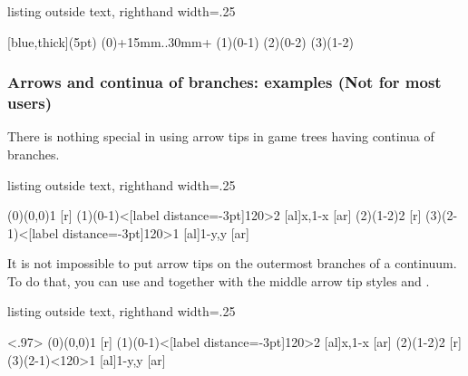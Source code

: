 \begin{tcblisting}{listing outside text, righthand width=.25\linewidth}
\begin{istgame}
[blue,thick](5pt)
\xtShowArrows
\istroot(0)+15mm..30mm+  \istb[blue] \istb[red] \endist
\xtHideArrows
\istroot(1)(0-1)   \istb \endist
\xtHideArrows* %
\istroot(2)(0-2)   \istb \endist
{}
\istroot(3)(1-2)   \istb \endist
\end{istgame}
\end{tcblisting}


\subsubsection{Arrows and continua of branches: examples (Not for most users)}

There is nothing special in using arrow tips in game trees having continua of branches.

\begin{tcblisting}{listing outside text, righthand width=.25\linewidth}
\begin{istgame}[font=\scriptsize]
\xtdistance{10mm}{20mm}
\xtShowArrows
\istrootcntm(0)(0,0){1}  [r]  \istbm  \endist
\istroot(1)(0-1)<[label distance=-3pt]120>{2}
  [al]{x,1-x}    [ar]         \endist
\istrootcntm(2)(1-2){2}  [r]  \istbm  \endist
\istroot(3)(2-1)<[label distance=-3pt]120>{1}
  [al]{1-y,y}  [ar]         \endist
\end{istgame}
\end{tcblisting}

It is not impossible to put arrow tips on the outermost branches of a continuum.
To do that, you can use \cmd{\cntmistb(*)} and \cmd{\cntmAistb(*)} together with the middle arrow tip styles and \cmd{\setxtarrowtips}.

\begin{tcblisting}{listing outside text, righthand width=.25\linewidth}
\begin{istgame}[font=\scriptsize]
\xtdistance{10mm}{20mm}
\xtShowArrows
\setxtarrowtips<.97>
\cntmistb*[->-,draw]
\istrootcntm(0)(0,0){1}  [r]  \istbm  \endist
\istroot(1)(0-1)<[label distance=-3pt]120>{2}
  [al]{x,1-x}    [ar]         \endist
\cntmistb*[->-,draw]
\istrootcntm(2)(1-2){2}  [r]  \istbm  \endist
\istroot(3)(2-1)<120>{1}
  [al]{1-y,y}  [ar]         \endist
\end{istgame}
\end{tcblisting}

